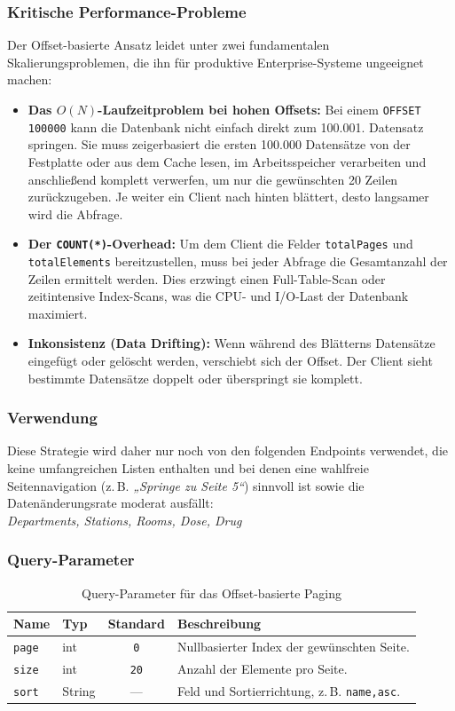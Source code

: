 \subsubsection*{Kritische Performance-Probleme}
Der Offset-basierte Ansatz leidet unter zwei fundamentalen Skalierungsproblemen, die ihn für produktive Enterprise-Systeme ungeeignet machen:
\begin{itemize}
    \item \textbf{Das $O(N)$-Laufzeitproblem bei hohen Offsets:} Bei einem \texttt{OFFSET 100000} kann die Datenbank nicht einfach direkt zum 100.001. Datensatz springen. 
    Sie muss zeigerbasiert die ersten 100.000 Datensätze von der Festplatte oder aus dem Cache lesen, im Arbeitsspeicher verarbeiten und anschließend komplett verwerfen, um nur die gewünschten 20 Zeilen zurückzugeben. Je weiter ein Client nach hinten blättert, desto langsamer wird die Abfrage.
    \item \textbf{Der \texttt{COUNT(*)}-Overhead:} Um dem Client die Felder \texttt{totalPages} und \texttt{totalElements} bereitzustellen, muss bei jeder Abfrage die Gesamtanzahl der Zeilen ermittelt werden. 
    Dies erzwingt einen Full-Table-Scan oder zeitintensive Index-Scans, was die CPU- und I/O-Last der Datenbank maximiert.
    \item \textbf{Inkonsistenz (Data Drifting):} Wenn während des Blätterns Datensätze eingefügt oder gelöscht werden, verschiebt sich der Offset. Der Client sieht bestimmte Datensätze doppelt oder überspringt sie komplett.
\end{itemize}

\subsubsection*{Verwendung}
Diese Strategie wird daher nur noch von den folgenden Endpoints verwendet, die keine umfangreichen Listen enthalten und bei denen eine wahlfreie Seitennavigation (z.\,B. \textit{„Springe zu Seite 5“}) sinnvoll ist sowie die Datenänderungsrate moderat ausfällt: 
\\\textit{Departments, Stations, Rooms, Dose, Drug}

\subsubsection*{Query-Parameter}
\begin{table}[H]
\centering
\small
\begin{tabularx}{\textwidth}{|l|l|c|X|}
\hline
\textbf{Name} & \textbf{Typ} & \textbf{Standard} & \textbf{Beschreibung} \\ \hline
\texttt{page} & int & \texttt{0} & Nullbasierter Index der gewünschten Seite. \\ \hline
\texttt{size} & int & \texttt{20} & Anzahl der Elemente pro Seite. \\ \hline
\texttt{sort} & String & — & Feld und Sortierrichtung, z.\,B. \texttt{name,asc}. \\ \hline
\end{tabularx}
\caption{Query-Parameter für das Offset-basierte Paging}
\end{table}

